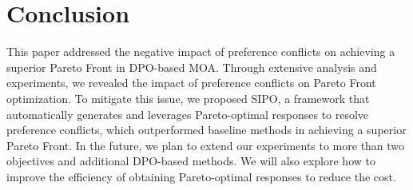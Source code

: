 \section{Conclusion}
This paper addressed the negative impact of preference conflicts on achieving a superior Pareto Front in DPO-based MOA. 
Through extensive analysis and experiments, we revealed the impact of preference conflicts on Pareto Front optimization. 
To mitigate this issue, we proposed SIPO, a framework that automatically generates and leverages Pareto-optimal responses to resolve preference conflicts, which outperformed baseline methods in achieving a superior Pareto Front. 
In the future, we plan to extend our experiments to more than two objectives and additional DPO-based methods. 
We will also explore how to improve the efficiency of obtaining Pareto-optimal responses to reduce the cost. 






